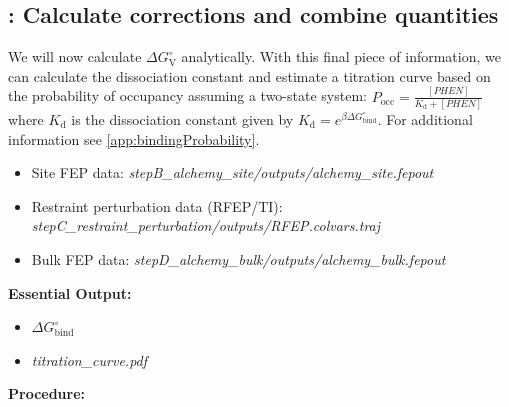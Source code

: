 \documentclass[9pt,tutorial]{Styling/livecoms}
\newcommand{\filepath}[1]{\textit{#1}}
\begin{document}
\subsection{\hspace{-1em}: Calculate corrections and combine quantities}\label{step:combinequantities}
    \begin{tcolorbox}[colback=blue!5!white,colframe=blue!75!black]
    We will now calculate $\Delta G^\circ_\mathrm{V}$ analytically. With this final piece of information, we can calculate the dissociation constant and estimate a titration curve based on the probability of occupancy assuming a two-state system: $P_\mathrm{occ}=\frac{[PHEN]}{K_\mathrm{d}+[PHEN]}$ where ${K_\mathrm{d}}$ is the dissociation constant given by ${K_\mathrm{d}}=e^{\beta \Delta G^\circ_\mathrm{bind}}$. For additional information see \ref{app:bindingProbability}.
    \end{tcolorbox}
    \begin{itemize}
        \item Site FEP data: \filepath{stepB\_alchemy\_site/outputs/alchemy\_site.fepout} 
        \item Restraint perturbation data (RFEP/TI): \filepath{stepC\_restraint\_perturbation/outputs/RFEP.colvars.traj}
        \item Bulk FEP data: \filepath{stepD\_alchemy\_bulk/outputs/alchemy\_bulk.fepout}
    \end{itemize}
    \textbf{Essential Output:}
    \begin{itemize}
        \item $\Delta G^\circ_{\mathrm{bind}}$
        \item \filepath{titration\_curve.pdf}
    \end{itemize}
    \textbf{Procedure:}
\end{document}
